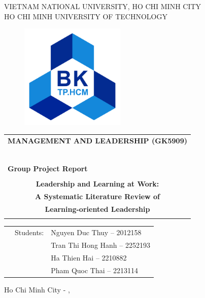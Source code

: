 \begin{titlepage}
\begin{center}
VIETNAM NATIONAL UNIVERSITY, HO CHI MINH CITY \\
HO CHI MINH UNIVERSITY OF TECHNOLOGY \\
\end{center}

\vspace{1cm}

\begin{figure}[h!]
\begin{center}
\includegraphics[width=5cm]{images/hcmut.png}
\end{center}
\end{figure}

\vspace{1cm}


\begin{center}
\begin{tabular}{c}
\multicolumn{1}{l}{\textbf{{\Large MANAGEMENT AND LEADERSHIP (GK5909)}}}\\
~~\\
\hline
\\
\multicolumn{1}{l}{\textbf{{\Large Group Project Report}}}\\
\\
\textbf{{\Huge Leadership and Learning at Work:}}\\
\textbf{{\Huge A Systematic Literature Review of}}\\
\textbf{{\Huge Learning-oriented Leadership}}\\
\\
\hline
\end{tabular}
\end{center}

\vspace{1.5cm}

\begin{table}[h]
\begin{tabular}{rrl}
\hspace{5 cm} & Students: & Nguyen Duc Thuy     -- 2012158 \\
              &           & Tran Thi Hong Hanh  -- 2252193 \\
              &           & Ha Thien Hai        -- 2210882 \\
              &           & Pham Quoc Thai      -- 2213114


\end{tabular}
\end{table}
\vspace{1.5cm}
\begin{center}
{\footnotesize Ho Chi Minh City - \monthname[\the\month], \the\year}
\end{center}
\end{titlepage}
    